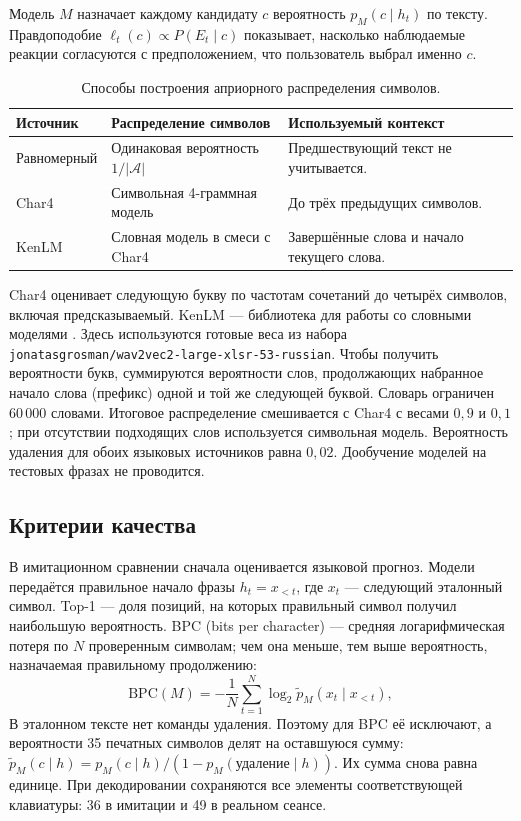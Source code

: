 \documentclass[11pt,a4paper]{article}
\begin{document}
Модель $M$ назначает каждому кандидату $c$ вероятность $p_M(c\mid h_t)$ по тексту. Правдоподобие $\ell_t(c)\propto P(E_t\mid c)$ показывает, насколько наблюдаемые реакции согласуются с предположением, что пользователь выбрал именно $c$.

\begin{table}[h]
\caption{Способы построения априорного распределения символов.}
\small\centering
\begin{tabularx}{\linewidth}{@{}lYY@{}}\toprule
Источник & Распределение символов & Используемый контекст \\\midrule
Равномерный & Одинаковая вероятность $1/|\mathcal A|$ & Предшествующий текст не учитывается.\\
Char4 & Символьная 4-граммная модель & До трёх предыдущих символов.\\
KenLM & Словная модель в смеси с Char4 & Завершённые слова и начало текущего слова.\\\bottomrule
\end{tabularx}
\end{table}

Char4 оценивает следующую букву по частотам сочетаний до четырёх символов, включая предсказываемый. KenLM --- библиотека для работы со словными моделями \citep{heafield2011}. Здесь используются готовые веса из набора \texttt{jonatasgrosman/wav2vec2-large-xlsr-53-russian}. Чтобы получить вероятности букв, суммируются вероятности слов, продолжающих набранное начало слова (префикс) одной и той же следующей буквой. Словарь ограничен 60\,000 словами. Итоговое распределение смешивается с Char4 с весами $0{,}9$ и $0{,}1$; при отсутствии подходящих слов используется символьная модель. Вероятность удаления для обоих языковых источников равна $0{,}02$. Дообучение моделей на тестовых фразах не проводится.

\subsection{Критерии качества}
В имитационном сравнении сначала оценивается языковой прогноз. Модели передаётся правильное начало фразы $h_t=x_{<t}$, где $x_t$ --- следующий эталонный символ. Top-1 --- доля позиций, на которых правильный символ получил наибольшую вероятность. BPC (bits per character) --- средняя логарифмическая потеря по $N$ проверенным символам; чем она меньше, тем выше вероятность, назначаемая правильному продолжению:
\begin{equation}
 \mathrm{BPC}(M)=-\frac1N\sum_{t=1}^{N}\log_2 \widetilde p_M(x_t\mid x_{<t}),
\end{equation}
В эталонном тексте нет команды удаления. Поэтому для BPC её исключают, а вероятности 35 печатных символов делят на оставшуюся сумму: $\widetilde p_M(c\mid h)=p_M(c\mid h)/(1-p_M(\text{удаление}\mid h))$. Их сумма снова равна единице. При декодировании сохраняются все элементы соответствующей клавиатуры: 36 в имитации и 49 в реальном сеансе.
\end{document}
